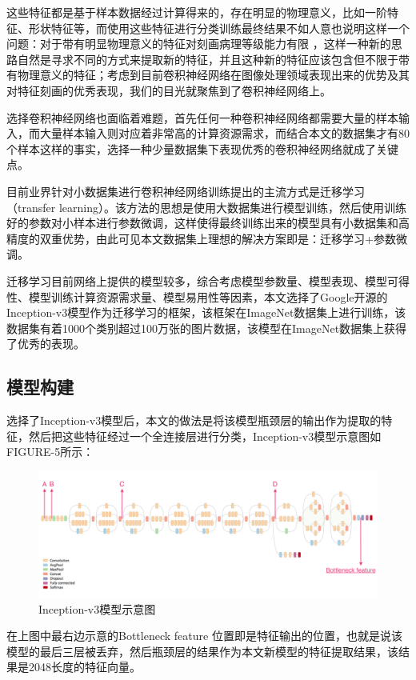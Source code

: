 \documentclass{ctexart}
\begin{document}
这些特征都是基于样本数据经过计算得来的，存在明显的物理意义，比如一阶特征、形状特征等，而使用这些特征进行分类训练最终结果不如人意也说明这样一个问题：对于带有明显物理意义的特征对刻画病理等级能力有限 ，这样一种新的思路自然是寻求不同的方式来提取新的特征，并且这种新的特征应该包含但不限于带有物理意义的特征；考虑到目前卷积神经网络在图像处理领域表现出来的优势及其对特征刻画的优秀表现，我们的目光就聚焦到了卷积神经网络上。

选择卷积神经网络也面临着难题，首先任何一种卷积神经网络都需要大量的样本输入，而大量样本输入则对应着非常高的计算资源需求，而结合本文的数据集才有80个样本这样的事实，选择一种少量数据集下表现优秀的卷积神经网络就成了关键点。

目前业界针对小数据集进行卷积神经网络训练提出的主流方式是迁移学习（transfer learning）。该方法的思想是使用大数据集进行模型训练，然后使用训练好的参数对小样本进行参数微调，这样使得最终训练出来的模型具有小数据集和高精度的双重优势，由此可见本文数据集上理想的解决方案即是：迁移学习+参数微调。

迁移学习目前网络上提供的模型较多，综合考虑模型参数量、模型表现、模型可得性、模型训练计算资源需求量、模型易用性等因素，本文选择了Google开源的Inception-v3模型作为迁移学习的框架，该框架在ImageNet数据集上进行训练，该数据集有着1000个类别超过100万张的图片数据，该模型在ImageNet数据集上获得了优秀的表现。

\subsection{模型构建}
选择了Inception-v3模型后，本文的做法是将该模型瓶颈层的输出作为提取的特征，然后把这些特征经过一个全连接层进行分类，Inception-v3模型示意图如FIGURE-5所示：
\begin{figure}[!htbp] 
\centering
\includegraphics[width=\linewidth]{img/inceptionV3.png} 
\caption{Inception-v3模型示意图}
\label{f5} 
\end{figure}

在上图中最右边示意的Bottleneck feature 位置即是特征输出的位置，也就是说该模型的最后三层被丢弃，然后瓶颈层的结果作为本文新模型的特征提取结果，该结果是2048长度的特征向量。
\end{document}
